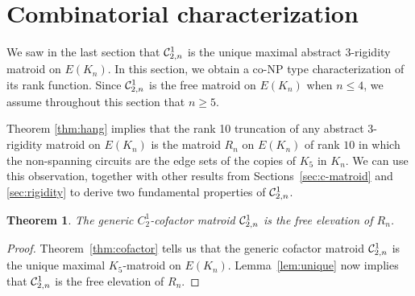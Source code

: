 \documentclass{daj}
\newtheorem{theorem}[thm]{Theorem}\theoremstyle{plain}
\begin{document}
\section{Combinatorial characterization}\label{sec:char}
We saw in the last section that ${\cal C}_{2,n}^1$ is the unique maximal abstract 3-rigidity matroid on $E(K_n)$.
In this section, we obtain a 
co-NP type characterization of its rank function.
Since ${\cal C}_{2,n}^1$ is the free matroid on $E(K_n)$ when $n\leq 4$, we assume throughout this section that $n\geq 5$. 

 
Theorem \ref{thm:hang} implies that the rank 10 truncation of any abstract 3-rigidity matroid on $E(K_n)$ is  the  matroid $R_{n}$ on $E(K_n)$ of rank $10$ in which the non-spanning circuits are the edge sets of the copies of $K_5$ in $K_n$. We can use this observation, together with other 
results from  Sections~\ref{sec:c-matroid} and  \ref{sec:rigidity} to derive two fundamental properties of ${\cal C}^1_{2,n}$.

\begin{theorem}\label{thm:K5free}
The generic $C_2^1$-cofactor matroid ${\cal C}_{2,n}^1$ is the free elevation of $R_{n}$.
\end{theorem}
\begin{proof}
Theorem~\ref{thm:cofactor} tells us that the generic cofactor matroid ${\cal C}^1_{2,n}$ is the unique maximal $K_5$-matroid on $E(K_n)$.
Lemma~\ref{lem:unique} now implies that
${\cal C}^1_{2,n}$ is the free elevation of $R_{n}$.
\end{proof}
\end{document}
